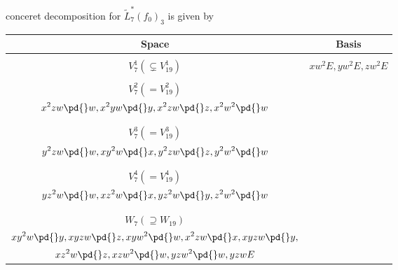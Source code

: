  conceret decomposition for $\tilde L^*_7(f_0)_3$ is given by
\begin{center}
\begin{longtable}{ c |  c }
Space &Basis \\
\hline
	&\\
$V_7^1(\subsetneq V_{19}^1)$ & $\displaystyle xw^2E,yw^2E,zw^2E$ \\
	&\\
$V_7^2(=V_{19}^2)$ & \begin{tabular}{c}
	$\displaystyle
	x^2y^2\pd{}y,
	x^2yz\pd{}z,
	x^2yw\pd{}w,
	x^2yz\pd{}y,
	x^2z^2\pd{}z,$ \\
	$\displaystyle
	x^2zw\pd{}w,
	x^2yw\pd{}y,
	x^2zw\pd{}z,
	x^2w^2\pd{}w$\\
\end{tabular}\\
	&\\
$V_7^3(=V_{19}^3)$ & 
\begin{tabular}{c}
	$\displaystyle
	x^2y^2\pd{}x,
	xy^2z\pd{}z,
	xy^2w\pd{}w,
	xy^2z\pd{}x,
	y^2z^2\pd{}z,$\\
	$\displaystyle
	y^2zw\pd{}w,
	xy^2w\pd{}x,
	y^2zw\pd{}z,
	y^2w^2\pd{}w$\\
\end{tabular}\\
	&\\
$V_7^4(=V_{19}^4)$ &
\begin{tabular}{c}
	$\displaystyle
	x^2z^2\pd{}x,
	xyz^2\pd{}y,
	xz^2w\pd{}w,
	xyz^2\pd{}x,
	y^2z^2\pd{}y,$\\
	$\displaystyle
	yz^2w\pd{}w,
	xz^2w\pd{}x,
	yz^2w\pd{}y,
	z^2w^2\pd{}w$\\
\end{tabular}\\
	&\\
$W_7(\supseteq W_{19})$ & 
\begin{tabular}{c}
$\displaystyle 	
	x^2yz\pd{}x,
	xy^2z\pd{}y,
	xyz^2\pd{}z, 	 
	xyzw\pd{}w,
	x^2yw\pd{}x,$\\
$\displaystyle
	xy^2w\pd{}y,
	xyzw\pd{}z,
	xyw^2\pd{}w,
	x^2zw\pd{}x,
	xyzw\pd{}y,$\\
$\displaystyle
	xz^2w\pd{}z,
	xzw^2\pd{}w,
	yzw^2\pd{}w,
	yzwE$
\end{tabular}  
\end{longtable}
\end{center}

